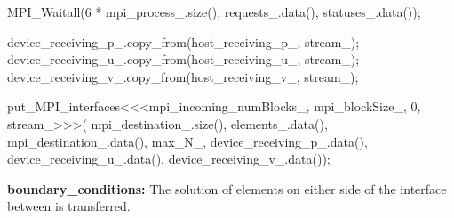 \begin{algorithm}[H]
\begin{cuda}
{            MPI_Waitall(6 * mpi_process_.size(), requests_.data(), statuses_.data());

            device_receiving_p_.copy_from(host_receiving_p_, stream_);
            device_receiving_u_.copy_from(host_receiving_u_, stream_);
            device_receiving_v_.copy_from(host_receiving_v_, stream_);

            put_MPI_interfaces<<<mpi_incoming_numBlocks_, mpi_blockSize_, 0, stream_>>>(
                mpi_destination_.size(), elements_.data(), 
                mpi_destination_.data(), max_N_, 
                device_receiving_p_.data(), device_receiving_u_.data(), device_receiving_v_.data());
        }\end{cuda}
\caption{\textbf{boundary\_conditions:} The solution of elements on either side of the interface between  is transferred.}\label{alg:boundary_conditions}
\end{algorithm}